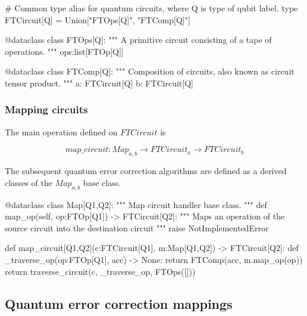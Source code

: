   \begin{python}
  # Common type alias for quantum circuits, where Q is type of qubit label.
  type FTCircuit[Q] = Union["FTOps[Q]", "FTComp[Q]"]
  
  @dataclass
  class FTOps[Q]:
    """ A primitive circuit consisting of a tape of operations. """
    ops:list[FTOp[Q]]
  
  @dataclass
  class FTComp[Q]:
    """ Composition of circuits, also known as circuit tensor product. """
    a: FTCircuit[Q]
    b: FTCircuit[Q]
  \end{python}


\subsubsection{Mapping circuits}

The main operation defined on $FTCircuit$ is

$$
map\_circuit : Map_{a,b} \to FTCircuit_a \to FTCircuit_b
$$

The subsequent quantum error correction algorithms are defined as a derived classes of the
$Map_{a,b}$ base class.

  \begin{comment}
    \begin{sh}
    printf '\\begin{%
    cat $PROJECT_ROOT/python/qecsurface/type.py | sedlines.sh 'Circuit mapping'
    printf '\\end{%
    \end{sh}
  \end{comment}

  \begin{python}
  @dataclass
  class Map[Q1,Q2]:
    """ Map circuit handler base class. """
    def map_op(self, op:FTOp[Q1]) -> FTCircuit[Q2]:
      """ Maps an operation of the source circuit into the destination circuit """
      raise NotImplementedError
  
  
  def map_circuit[Q1,Q2](c:FTCircuit[Q1], m:Map[Q1,Q2]) -> FTCircuit[Q2]:
    def _traverse_op(op:FTOp[Q1], acc) -> None:
      return FTComp(acc, m.map_op(op))
    return traverse_circuit(c, _traverse_op, FTOps([]))
  \end{python}


\subsection{Quantum error correction mappings}

